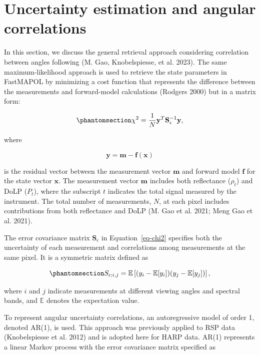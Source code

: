 \documentclass[
  letterpaper,
  open=any]{scrbook}
\begin{document}
\chapter{Uncertainty estimation and angular
correlations}\label{uncertainty-estimation-and-angular-correlations}

In this section, we discuss the general retrieval approach considering
correlation between angles following (M. Gao, Knobelspiesse, et al.
2023). The same maximum-likelihood approach is used to retrieve the
state parameters in FastMAPOL by minimizing a cost function that
represents the difference between the measurements and forward-model
calculations (Rodgers 2000) but in a matrix form:

\begin{equation}\phantomsection\label{eq-chi2}{
\chi^2
=
\frac{1}{N}
\mathbf{y}^{T}
\mathbf{S}_{\epsilon}^{-1}
\mathbf{y},
}\end{equation}

where

\[
\mathbf{y}
=
\mathbf{m}
-
\mathbf{f}(\mathbf{x})
\]

is the residual vector between the measurement vector \(\mathbf{m}\) and
forward model \(\mathbf{f}\) for the state vector \(\mathbf{x}\). The
measurement vector \(\mathbf{m}\) includes both reflectance (\(\rho_t\))
and DoLP (\(P_t\)), where the subscript \(t\) indicates the total signal
measured by the instrument. The total number of measurements, \(N\), at
each pixel includes contributions from both reflectance and DoLP (M. Gao
et al. 2021; Meng Gao et al. 2021).

The error covariance matrix \(\mathbf{S}_{\epsilon}\) in
Equation~\ref{eq-chi2} specifies both the uncertainty of each
measurement and correlations among measurements at the same pixel. It is
a symmetric matrix defined as

\begin{equation}\phantomsection\label{eq-covariance-definition}{
S_{\epsilon;i,j}
=
\mathbb{E}
\left[
(y_i-\mathbb{E}[y_i])
(y_j-\mathbb{E}[y_j])
\right],
}\end{equation}

where \(i\) and \(j\) indicate measurements at different viewing angles
and spectral bands, and \(\mathbb{E}\) denotes the expectation value.

To represent angular uncertainty correlations, an autoregressive model
of order 1, denoted AR(1), is used. This approach was previously applied
to RSP data (Knobelspiesse et al. 2012) and is adopted here for HARP
data. AR(1) represents a linear Markov process with the error covariance
matrix specified as
\end{document}
